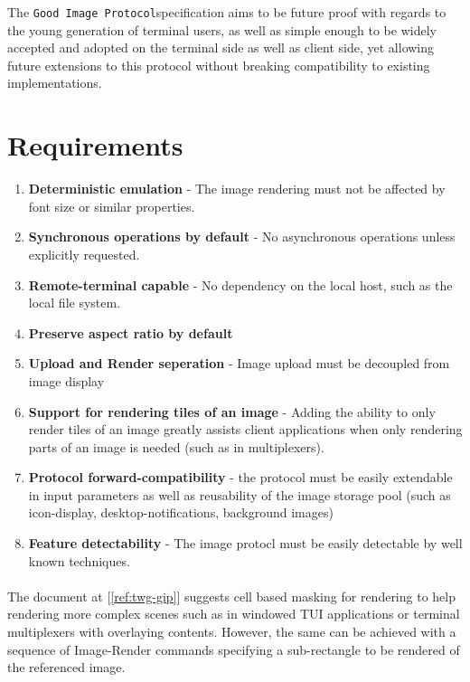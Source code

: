 \documentclass{article}
\newcommand{\code}[1]{\colorbox{light-gray}{\texttt{#1}}}
\newcommand{\GoodImageProtocol}{\code{Good Image Protocol}}
\begin{document}
The \GoodImageProtocol specification aims to be future proof with regards to the young generation
of terminal users, as well as simple enough to be widely accepted and adopted on the terminal side
as well as client side, yet allowing future extensions to this protocol
without breaking compatibility to existing implementations.

\section{Requirements} %

\begin{enumerate}
    \item \textbf{Deterministic emulation} - The image rendering must not be affected by font size or similar properties.
    \item \textbf{Synchronous operations by default} - No asynchronous operations unless explicitly requested.
    \item \textbf{Remote-terminal capable} - No dependency on the local host, such as the local file system.
    \item \textbf{Preserve aspect ratio by default}
    \item \textbf{Upload and Render seperation} - Image upload must be decoupled from image display
    \item \textbf{Support for rendering tiles of an image} - Adding the ability to only render tiles
        of an image greatly assists client applications when only rendering parts of an image is
        needed (such as in multiplexers).
    \item \textbf{Protocol forward-compatibility} - the protocol must be easily extendable in input
        parameters as well as reusability of the image storage pool
        (such as icon-display, desktop-notifications, background images)
    \item \textbf{Feature detectability} - The image protocl must be easily detectable by well known techniques.
\end{enumerate}

\paragraph*{}

The document at [\ref{ref:twg-gip}] suggests cell based masking for rendering to help rendering more
complex scenes such as in windowed TUI applications or terminal multiplexers with overlaying contents.
However, the same can be achieved with a sequence of Image-Render commands specifying a
sub-rectangle to be rendered of the referenced image.
\end{document}

